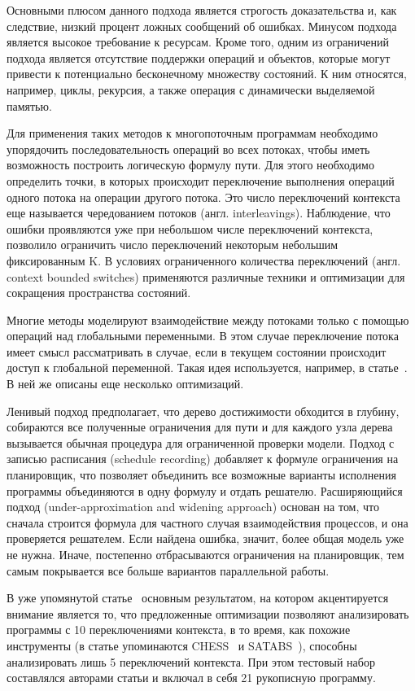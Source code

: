 Основными плюсом данного подхода является строгость доказательства и, как следствие, низкий процент ложных сообщений об ошибках.
Минусом подхода является высокое требование к ресурсам.
Кроме того, одним из ограничений подхода является отсутствие поддержки операций и объектов, которые могут привести к потенциально бесконечному множеству состояний.
К ним относятся, например, циклы, рекурсия, а также операция с динамически выделяемой памятью. 

Для применения таких методов к многопоточным программам необходимо упорядочить последовательность операций во всех потоках, чтобы иметь возможность построить логическую формулу пути.
Для этого необходимо определить точки, в которых происходит переключение выполнения операций одного потока на операции другого потока.
Это число переключений контекста еще называется чередованием потоков (англ. interleavings).
Наблюдение, что ошибки проявляются уже при небольшом числе переключений контекста, позволило ограничить число переключений некоторым небольшим фиксированным K.
В условиях ограниченного количества переключений (англ. context bounded switches) применяются различные техники и оптимизации для сокращения пространства состояний. 

Многие методы моделируют взаимодействие между потоками только с помощью операций над глобальными переменными.
В этом случае переключение потока имеет смысл рассматривать в случае, если в текущем состоянии происходит доступ к глобальной переменной.
Такая идея используется, например, в статье~\cite{Cordeiro:2011}. В ней же описаны еще несколько оптимизаций.

Ленивый подход предполагает, что дерево достижимости обходится в глубину, собираются все полученные ограничения для пути и для каждого узла дерева вызывается обычная процедура для ограниченной проверки модели.
Подход с записью расписания (schedule recording) добавляет к формуле ограничения на планировщик, что позволяет объединить все возможные варианты исполнения программы объединяются в одну формулу и отдать решателю.
Расширяющийся подход (under-approximation and widening approach) основан на том, что сначала строится формула для частного случая взаимодействия процессов, и она проверяется решателем.
Если найдена ошибка, значит, более общая модель уже не нужна. Иначе, постепенно отбрасываются ограничения на планировщик, тем самым покрывается все больше вариантов параллельной работы. 

В уже упомянутой статье~\cite{Cordeiro:2011} основным результатом, на котором акцентируется внимание является то, что предложенные оптимизации позволяют анализировать программы с 10 переключениями контекста, в то время, как похожие инструменты (в статье упоминаются CHESS~\cite{Musuvathi:2007} и SATABS~\cite{SATabs}), способны анализировать лишь 5 переключений контекста.
При этом тестовый набор составлялся авторами статьи и включал в себя 21 рукописную программу. 

